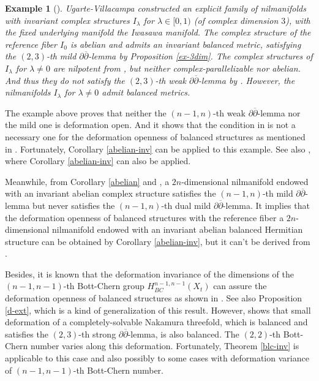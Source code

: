 \documentclass[12pt]{amsart}
\numberwithin{equation}{section}
\newtheorem{example}  [theorem]     {Example}
\renewcommand{\1}{\mathds{1}}
\newcommand{\db}{\overline{\partial}}
\renewcommand{\>}{\rightarrow}
\newcommand{\p}{\partial}
\def\p{\partial}
\begin{document}
\begin{example}[{\cite[Example 3.7]{UV}}]\label{not-fy}
\emph{Ugarte-Villacampa constructed an explicit family of
nilmanifolds with invariant complex structures $I_{\lambda}$ for
$\lambda\in[0,1)$ (of complex dimension $3$), with the fixed
underlying manifold the Iwasawa manifold. The complex structure of
the reference  fiber $I_{0}$ is abelian and admits an invariant
balanced metric, satisfying the $(2,3)$-th mild $\p\db$-lemma by
Proposition \ref{ex-3dim}. The complex structures of $I_{\lambda}$
for $\lambda \neq 0$ are nilpotent from \cite[Cororllary 2]{CFP},
but neither complex-parallelizable nor abelian. And thus they do not
satisfy the $(2,3)$-th weak $\p\db$-lemma by \cite[Proposition
3.6]{UV}. However, the nilmanifolds $I_{\lambda}$ for $\lambda \neq
0$ admit balanced metrics.}
\end{example}

The example above proves that neither the $(n-1,n)$-th weak
$\p\db$-lemma nor the mild one is deformation open. And it shows
that the condition in \cite[Theorem 6]{FY} is not a necessary one
for the deformation openness of balanced structures as mentioned in
\cite[the discussion ahead of Example 3.7]{UV}. Fortunately, Corollary
\ref{abelian-inv} can be applied to this example. See also
\cite[Remark 4.7]{au}, where Corollary \ref{abelian-inv} can also be
applied.

Meanwhile, from Corollary \ref{abelian} and \cite[Proposition
2.9]{AU}, a $2n$-dimensional nilmanifold endowed with an invariant
abelian complex structure satisfies the $(n-1,n)$-th mild
$\p\db$-lemma but never satisfies the $(n-1,n)$-th dual mild
$\p\db$-lemma. It implies that the deformation openness of balanced
structures with the reference  fiber a $2n$-dimensional nilmanifold
endowed with an invariant abelian balanced Hermitian structure can
be obtained by Corollary \ref{abelian-inv}, but it can't be derived
from \cite[Theorem 4.9]{au}.

Besides, it is known that the deformation invariance of the
dimensions of the $(n-1,n-1)$-th Bott-Chern group
$H^{n-1,n-1}_{BC}(X_t)$ can assure the deformation openness of
balanced structures as shown in \cite[Proposition 4.1]{au}. See also
Proposition \ref{d-ext}, which is a kind of generalization of this
result. However, \cite[Example 4.10]{au} shows that small
deformation of a completely-solvable Nakamura threefold, which is
balanced and satisfies the $(2,3)$-th strong $\p\db$-lemma, is also
balanced. The $(2,2)$-th Bott-Chern number varies along this
deformation. Fortunately, Theorem \ref{blc-inv} is applicable to
this case and also possibly to some cases with deformation variance
of $(n-1,n-1)$-th Bott-Chern number.
\end{document}
